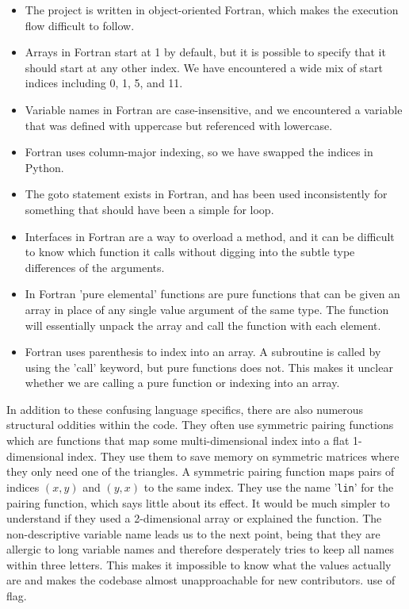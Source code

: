 \begin{itemize}
        \item The project is written in object-oriented Fortran, which makes the execution flow difficult to follow.
        \item Arrays in Fortran start at 1 by default, but it is possible to specify that it should start at any other index. We have encountered a wide mix of start indices including 0, 1, 5, and 11.
        \item Variable names in Fortran are case-insensitive, and we encountered a variable that was defined with uppercase but referenced with lowercase.
        \item Fortran uses column-major indexing, so we have swapped the indices in Python.
        \item The goto statement exists in Fortran, and has been used inconsistently for something that should have been a simple for loop.
        \item Interfaces in Fortran are a way to overload a method, and it can be difficult to know which function it calls without digging into the subtle type differences of the arguments.
        \item In Fortran 'pure elemental' functions are pure functions that can be given an array in place of any single value argument of the same type. The function will essentially unpack the array and call the function with each element.
        \item Fortran uses parenthesis to index into an array. A subroutine is called by using the 'call' keyword, but pure functions does not. This makes it unclear whether we are calling a pure function or indexing into an array.
\end{itemize}

In addition to these confusing language specifics, there are also numerous structural oddities within the code. They often use symmetric pairing functions which are functions that map some multi-dimensional index into a flat 1-dimensional index. They use them to save memory on symmetric matrices where they only need one of the triangles. A symmetric pairing function maps pairs of indices $(x,y)$ and $(y,x)$ to the same index. They use the name '\verb|lin|' for the pairing function, which says little about its effect. It would be much simpler to understand if they used a 2-dimensional array or explained the function.
The non-descriptive variable name leads us to the next point, being that they are allergic to long variable names and therefore desperately tries to keep all names within three letters. This makes it impossible to know what the values actually are and makes the codebase almost unapproachable for new contributors.
 use of flag.

